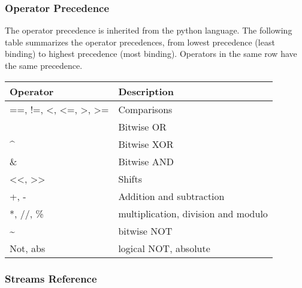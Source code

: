 \documentclass[letterpaper,10pt,english]{manual}
\begin{document}
\subsubsection{Operator Precedence}

The operator precedence is inherited from the python language. The following
table summarizes the operator precedences, from lowest precedence (least
binding) to highest precedence (most binding). Operators in the same row have
the same precedence.

\begin{tabulary}{\textwidth}{|L|L|}
\hline
\textbf{
Operator
} & \textbf{
Description
}\\
\hline

==, !=, \textless{}, \textless{}=, \textgreater{}, \textgreater{}=
 & 
Comparisons
\\
{\raggedright{}~}
 & 
Bitwise OR
\\

\textasciicircum{}
 & 
Bitwise XOR
\\

\&
 & 
Bitwise AND
\\

\textless{}\textless{}, \textgreater{}\textgreater{}
 & 
Shifts
\\

+, -
 & 
Addition and subtraction
\\

*, //, \%
 & 
multiplication, division and modulo
\\

\textasciitilde{}
 & 
bitwise NOT
\\

Not, abs
 & 
logical NOT, absolute
\\
\hline
\end{tabulary}



\subsubsection{Streams Reference}
\end{document}
